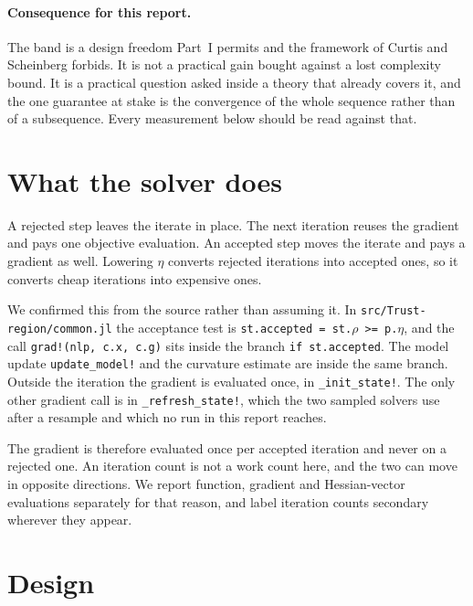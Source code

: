 \documentclass[11pt,a4paper]{article}
\begin{document}
\paragraph{Consequence for this report.}
The band is a design freedom Part~I permits and the framework of Curtis and
Scheinberg forbids. It is not a practical gain bought against a lost complexity
bound. It is a practical question asked inside a theory that already covers it,
and the one guarantee at stake is the convergence of the whole sequence rather
than of a subsequence. Every measurement below should be read against that.

\section{What the solver does}
\label{sec: solver}

A rejected step leaves the iterate in place. The next iteration reuses the
gradient and pays one objective evaluation. An accepted step moves the iterate
and pays a gradient as well. Lowering $\eta$ converts rejected iterations into
accepted ones, so it converts cheap iterations into expensive ones.

We confirmed this from the source rather than assuming it. In
\texttt{src/Trust-region/common.jl} the acceptance test is
\texttt{st.accepted = st.$\rho$ >= p.$\eta$}, and the call
\texttt{grad!(nlp, c.x, c.g)} sits inside the branch \texttt{if st.accepted}.
The model update \texttt{update\_model!} and the curvature estimate are inside
the same branch. Outside the iteration the gradient is evaluated once, in
\texttt{\_init\_state!}. The only other gradient call is in
\texttt{\_refresh\_state!}, which the two sampled solvers use after a resample
and which no run in this report reaches.

The gradient is therefore evaluated once per accepted iteration and never on a
rejected one. An iteration count is not a work count here, and the two can move
in opposite directions. We report function, gradient and Hessian-vector
evaluations separately for that reason, and label iteration counts secondary
wherever they appear.

\section{Design}
\label{sec: design}
\end{document}
